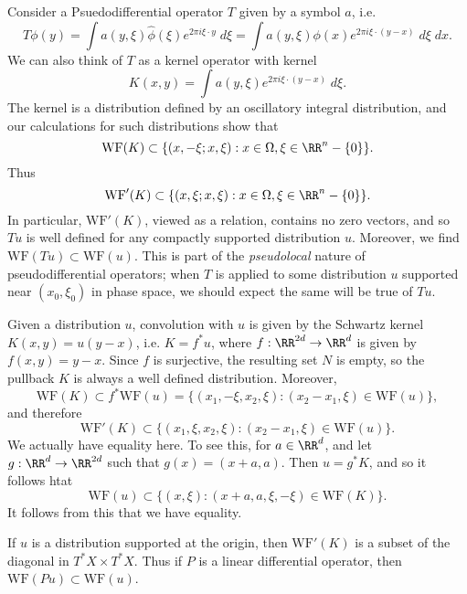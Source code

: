 \begin{example}
    Consider a Psuedodifferential operator $T$ given by a symbol $a$, i.e.
    \[ T\phi(y) = \int a(y,\xi) \widehat{\phi}(\xi) e^{2 \pi i \xi \cdot y}\; d\xi = \int a(y,\xi) \phi(x) e^{2 \pi i \xi \cdot (y - x)}\; d\xi\; dx. \]
    We can also think of $T$ as a kernel operator with kernel
    \[ K(x,y) = \int a(y,\xi) e^{2 \pi i \xi \cdot (y - x)} \; d\xi. \]
    The kernel is a distribution defined by an oscillatory integral distribution, and our calculations for such distributions show that
    \[ \text{WF}(K) \subset \{ (x,-\xi;x,\xi) : x \in \Omega, \xi \in \RR^n - \{ 0 \} \}. \]
    Thus
    \[ \text{WF}'(K) \subset \{ (x,\xi;x,\xi) : x \in \Omega, \xi \in \RR^n - \{ 0 \} \}. \]
    In particular, $\text{WF}'(K)$, viewed as a relation, contains no zero vectors, and so $Tu$ is well defined for any compactly supported distribution $u$. Moreover, we find $\text{WF}(Tu) \subset \text{WF}(u)$. This is part of the \emph{pseudolocal} nature of pseudodifferential operators; when $T$ is applied to some distribution $u$ supported near $(x_0,\xi_0)$ in phase space, we should expect the same will be true of $Tu$.
\end{example}

\begin{example}
    Given a distribution $u$, convolution with $u$ is given by the Schwartz kernel $K(x,y) = u(y-x)$, i.e. $K = f^* u$, where $f:\RR^{2d} \to \RR^d$ is given by $f(x,y) = y-x$. Since $f$ is surjective, the resulting set $N$ is empty, so the pullback $K$ is always a well defined distribution. Moreover,
    \[ \text{WF}(K) \subset f^* \text{WF}(u) = \{ (x_1,-\xi,x_2,\xi): (x_2 - x_1, \xi) \in \text{WF}(u) \}, \]     
    and therefore
    \[ \text{WF}'(K) \subset \{ (x_1,\xi,x_2,\xi): (x_2 - x_1,\xi) \in \text{WF}(u) \}. \]
    We actually have equality here. To see this, for $a \in \RR^d$, and let $g: \RR^d \to \RR^{2d}$ such that $g(x) = (x + a, a)$. Then $u = g^* K$, and so it follows htat
    \[ \text{WF}(u) \subset \{ (x,\xi) : (x + a, a, \xi, -\xi) \in \text{WF}(K) \}. \]
    It follows from this that we have equality.

    If $u$ is a distribution supported at the origin, then $\text{WF}'(K)$ is a subset of the diagonal in $T^* X \times T^* X$. Thus if $P$ is a linear differential operator, then $\text{WF}(Pu) \subset \text{WF}(u)$.
\end{example}

